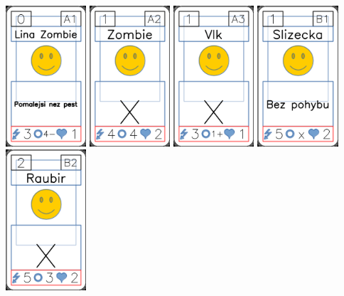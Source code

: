 \documentclass[a4paper]{article}
\begin{document}
	\includegraphics[width=3.0cm]{img-6_0}
	\includegraphics[width=3.0cm]{img-6_1}
	\includegraphics[width=3.0cm]{img-6_2}
	\includegraphics[width=3.0cm]{img-6_3}
	\includegraphics[width=3.0cm]{img-6_4}
\end{document}
